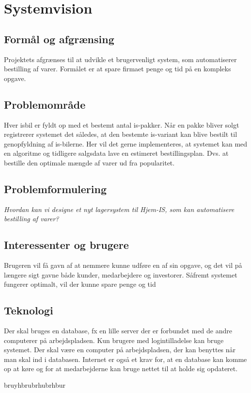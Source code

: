 \chapter{Systemvision}\label{ch:systemvision}

\section{Formål og afgrænsing}
Projektets afgrænses til at udvikle et brugervenligt system, som automatiserer bestilling af varer. 
Formålet er at spare firmaet penge og tid på en kompleks opgave.

\section{Problemområde}
Hver isbil er fyldt op med et bestemt antal is-pakker. Når en pakke bliver solgt registrerer systemet det således, at den bestemte is-variant kan blive bestilt til genopfyldning af is-bilerne. Her vil det gerne implementeres, at systemet kan med en algoritme og tidligere salgsdata lave en estimeret bestillingsplan. Dvs. at bestille den optimale mængde af varer ud fra popularitet. 


\section{Problemformulering}
 \textit{Hvordan kan vi designe et nyt lagersystem til Hjem-IS, som kan automatisere bestilling af varer?}

 \section{Interessenter og brugere}
 Brugeren vil få gavn af at nemmere kunne udføre en af sin opgave, og det vil på længere sigt gavne både kunder, medarbejdere og investorer. Såfremt systemet fungerer optimalt, vil der kunne spare penge og tid 

 \section{Teknologi}
 Der skal bruges en database, fx en lille server der er forbundet med de andre computerer på arbejdspladsen. Kun brugere med logintilladelse kan bruge systemet. Der skal være en computer på arbejdspladsen, der kan benyttes når man skal ind i databasen. Internet er også et krav for, at en database kan komme op at køre og for at medarbejderne kan bruge nettet til at holde sig opdateret.


 bruyhbrubrhubrhbur